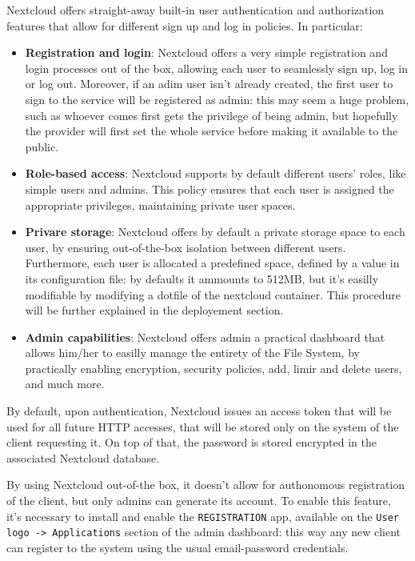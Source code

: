 \documentclass{article}
\begin{document}
	Nextcloud offers straight-away built-in user authentication and authorization features that allow for different sign up and log in policies. In particular:
	\begin{itemize}
		\item \textbf{Registration and login}: Nextcloud offers a very simple registration and login processes out of the box, allowing each user to seamlessly sign up, log in or log out. Moreover, if an adim user isn't already created, the first user to sign to the service will be registered as admin: this may seem a huge problem, such as whoever comes first gets the privilege of being admin, but hopefully the provider will first set the whole service before making it available to the public.
	
		\item \textbf{Role-based access}: Nextcloud supports by default different users' roles, like simple users and admins. This policy ensures that each user is assigned the appropriate privileges, maintaining private user spaces.
		
		\item \textbf{Privare storage}: Nextcloud offers by default a private storage space to each user, by ensuring out-of-the-box isolation between different users. Furthermore, each user is allocated a predefined space, defined by a value in its configuration file: by defaults it ammounts to 512MB, but it's easilly modifiable by modifying a dotfile of the nextcloud container. This procedure will be further explained in the deployement section.
		
		\item \textbf{Admin capabilities}: Nextcloud offers admin a practical dashboard that allows him/her to easilly manage the entirety of the File System, by practically enabling encryption, security policies, add, limir and delete users, and much more.
	\end{itemize}
	
	By default, upon authentication, Nextcloud issues an access token that will be used for all future HTTP accesses, that will be stored only on the system of the client requesting it. On top of that, the password is stored encrypted in the associated Nextcloud database.
	
	By using Nextcloud out-of-the box, it doesn't allow for authonomous registration of the client, but only admins can generate its account. To enable this feature, it's necessary to install and enable the \verb|REGISTRATION| app, available on the \verb|User logo -> Applications| section of the admin dashboard: this way any new client can register to the system using the usual email-password credentials.
	
\end{document}
